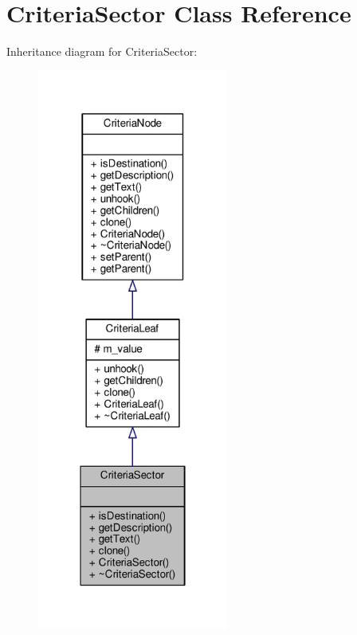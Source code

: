 \hypertarget{classCriteriaSector}{}\section{Criteria\+Sector Class Reference}
\label{classCriteriaSector}


Inheritance diagram for Criteria\+Sector\+:
\nopagebreak
\begin{figure}[H]
\begin{center}
\leavevmode
\includegraphics[width=178pt]{da/d1a/classCriteriaSector__inherit__graph}
\end{center}
\end{figure}


